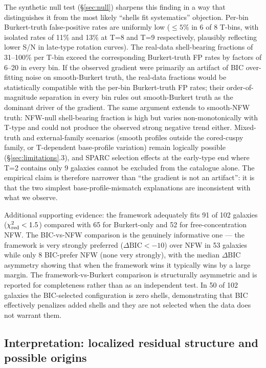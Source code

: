 The synthetic null test (\S\ref{sec:null}) sharpens this finding in a way that distinguishes it from the most likely ``shells fit systematics'' objection. Per-bin Burkert-truth false-positive rates are uniformly low ($\leq 5\%$ in 6 of 8 T-bins, with isolated rates of 11\% and 13\% at T=8 and T=9 respectively, plausibly reflecting lower S/N in late-type rotation curves). The real-data shell-bearing fractions of 31--100\% per T-bin exceed the corresponding Burkert-truth FP rates by factors of 6--20 in every bin. If the observed gradient were primarily an artifact of BIC over-fitting noise on smooth-Burkert truth, the real-data fractions would be statistically compatible with the per-bin Burkert-truth FP rates; their order-of-magnitude separation in every bin rules out smooth-Burkert truth as the dominant driver of the gradient. The same argument extends to smooth-NFW truth: NFW-null shell-bearing fraction is high but varies non-monotonically with T-type and could not produce the observed strong negative trend either. Mixed-truth and external-family scenarios (smooth profiles outside the cored-cuspy family, or T-dependent base-profile variation) remain logically possible (\S\ref{sec:limitations}.3), and SPARC selection effects at the early-type end where T=2 contains only 9 galaxies cannot be excluded from the catalogue alone. The empirical claim is therefore narrower than ``the gradient is not an artifact'': it is that the two simplest base-profile-mismatch explanations are inconsistent with what we observe.

Additional supporting evidence: the framework adequately fits 91 of 102 galaxies ($\chi^2_{\rm red} < 1.5$) compared with 65 for Burkert-only and 52 for free-concentration NFW. The BIC-vs-NFW comparison is the genuinely informative one --- the framework is very strongly preferred ($\Delta\mathrm{BIC} < -10$) over NFW in 53 galaxies while only 8 BIC-prefer NFW (none very strongly), with the median $\Delta\mathrm{BIC}$ asymmetry showing that when the framework wins it typically wins by a large margin. The framework-vs-Burkert comparison is structurally asymmetric and is reported for completeness rather than as an independent test. In 50 of 102 galaxies the BIC-selected configuration is zero shells, demonstrating that BIC effectively penalizes added shells and they are not selected when the data does not warrant them.

\subsection{Interpretation: localized residual structure and possible origins}

